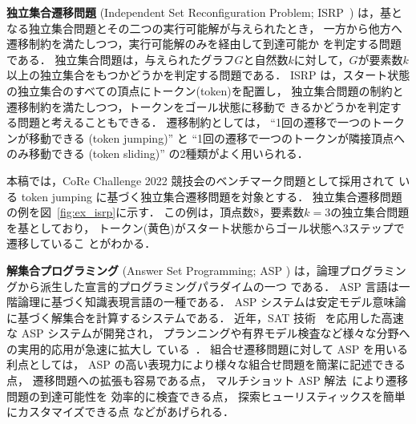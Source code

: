 \textbf{独立集合遷移問題}
(Independent Set Reconfiguration Problem; ISRP~\cite{core:ItoDHPSUU11})
は，基となる独立集合問題とその二つの実行可能解が与えられたとき，
一方から他方へ遷移制約を満たしつつ，実行可能解のみを経由して到達可能か
を判定する問題である．
独立集合問題は，与えられたグラフ$G$と自然数$k$に対して，$G$が要素数$k$
以上の独立集合をもつかどうかを判定する問題である．
ISRP は，スタート状態の独立集合のすべての頂点にトークン(token)を配置し，
独立集合問題の制約と遷移制約を満たしつつ，トークンをゴール状態に移動で
きるかどうかを判定する問題と考えることもできる．
遷移制約としては，
``1回の遷移で一つのトークンが移動できる (token jumping)''  と
``1回の遷移で一つのトークンが隣接頂点へのみ移動できる (token sliding)'' 
の2種類がよく用いられる．

本稿では，CoRe Challenge 2022 競技会のベンチマーク問題として採用されて
いる token jumping に基づく独立集合遷移問題を対象とする．
独立集合遷移問題の例を図~\ref{fig:ex_isrp}に示す．
この例は，頂点数8，要素数$k=3$の独立集合問題を基としており，
トークン(黄色)がスタート状態からゴール状態へ3ステップで遷移しているこ
とがわかる．

\textbf{解集合プログラミング}
(Answer Set Programming; ASP \cite{%
  Gelfond88:iclp,
  Niemela99:amai,
  Baral03:cambridge,
  Inoue08:jssst})
は，論理プログラミングから派生した宣言的プログラミングパラダイムの一つ
である．
ASP 言語は一階論理に基づく知識表現言語の一種である．
ASP システムは安定モデル意味論に基づく解集合を計算するシステムである．
近年，SAT 技術~\cite{Knuth:TAOCP:SAT}
を応用した高速な ASP システムが開発され，
プランニングや有界モデル検査など様々な分野への実用的応用が急速に拡大し
ている~\cite{Erdem16:AI}．
%
組合せ遷移問題に対して ASP を用いる利点としては，
ASP の高い表現力により様々な組合せ問題を簡潔に記述できる点，
遷移問題への拡張も容易である点，
マルチショット ASP 解法~\cite{GebserKKS19}により遷移問題の到達可能性を
効率的に検査できる点，
探索ヒューリスティックスを簡単にカスタマイズできる点
などがあげられる．

